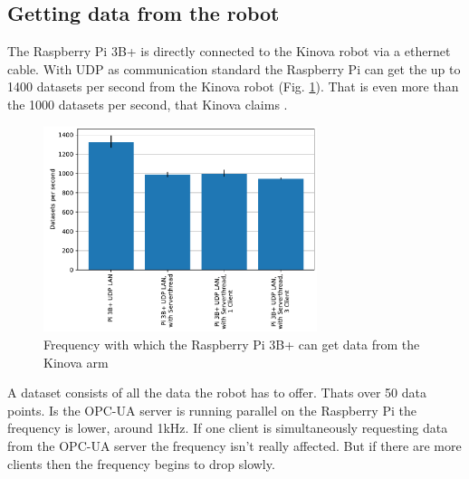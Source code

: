 \documentclass[conference]{IEEEtran}
\begin{document}
\subsection{Getting data from the robot}
The Raspberry Pi 3B+ is directly connected to the Kinova robot via a ethernet cable.
With UDP as communication standard the Raspberry Pi can get the up to 1400 datasets per second from the Kinova robot (Fig. \ref{fig:KortexAPISpeed}).
That is even more than the 1000 datasets per second, that Kinova claims \cite{KortexUDP}.
\begin{figure}[htbp]
    \centerline{\includegraphics[width=8cm]{Pictures/KortexAPISpeed.pdf}}
    \caption{Frequency with which the Raspberry Pi 3B+ can get data from the Kinova arm}
    \label{fig:KortexAPISpeed}
\end{figure}
A dataset consists of all the data the robot has to offer. Thats over 50 data points.
Is the OPC-UA server is running parallel on the Raspberry Pi the frequency is lower, around 1kHz.
If one client is simultaneously requesting data from the OPC-UA server the frequency isn't really affected.
But if there are more clients then the frequency begins to drop slowly.
\end{document}
